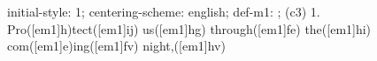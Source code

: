 initial-style: 1;
centering-scheme: english;
def-m1: \grealign;
(c3) 1. Pro([em1]h)tect([em1]ij) us([em1]hg) through([em1]fe) the([em1]hi) com([em1]e)ing([em1]fv) night,([em1]hv)